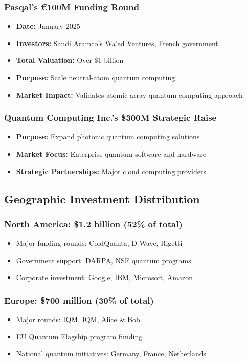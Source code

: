 \documentclass[12pt,a4paper]{article}
\begin{document}
\subsubsection{Pasqal's €100M Funding Round}
\begin{itemize}
    \item \textbf{Date:} January 2025
    \item \textbf{Investors:} Saudi Aramco's Wa'ed Ventures, French government
    \item \textbf{Total Valuation:} Over \$1 billion
    \item \textbf{Purpose:} Scale neutral-atom quantum computing
    \item \textbf{Market Impact:} Validates atomic array quantum computing approach
\end{itemize}

\subsubsection{Quantum Computing Inc.'s \$300M Strategic Raise}
\begin{itemize}
    \item \textbf{Purpose:} Expand photonic quantum computing solutions
    \item \textbf{Market Focus:} Enterprise quantum software and hardware
    \item \textbf{Strategic Partnerships:} Major cloud computing providers
\end{itemize}

\subsection{Geographic Investment Distribution}

\subsubsection{North America: \$1.2 billion (52\% of total)}
\begin{itemize}
    \item Major funding rounds: ColdQuanta, D-Wave, Rigetti
    \item Government support: DARPA, NSF quantum programs
    \item Corporate investment: Google, IBM, Microsoft, Amazon
\end{itemize}

\subsubsection{Europe: \$700 million (30\% of total)}
\begin{itemize}
    \item Major rounds: IQM, IQM, Alice \& Bob
    \item EU Quantum Flagship program funding
    \item National quantum initiatives: Germany, France, Netherlands
\end{itemize}
\end{document}
